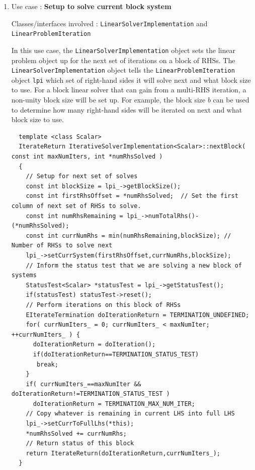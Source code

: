 \documentclass[pdf,ps2pdf,11pt]{SANDreport}
\begin{document}
\begin{enumerate}

{}\item Use case : \textbf{Setup to solve current block system}

{}\noindent{}Classes/interfaces involved :
{}\texttt{Linear\-Solver\-Implementation} and
{}\texttt{Linear\-Problem\-Iteration}

In this use case, the {}\texttt{Linear\-Solver\-Implementation} object
sets the linear problem object up for the next set of iterations on a
block of RHSs.  The {}\texttt{Linear\-Solver\-Implementation} object
tells the {}\texttt{Linear\-Problem\-Iteration} object {}\texttt{lpi}
which set of right-hand sides it will solve next and what block size
to use.  For a block linear solver that can gain from a multi-RHS
iteration, a non-unity block size will be set up.  For example, the
block size $b$ can be used to determine how many right-hand sides will
be iterated on next and what block size to use.

{\scriptsize\begin{verbatim}
  template <class Scalar>
  IterateReturn IterativeSolverImplementation<Scalar>::nextBlock( const int maxNumIters, int *numRhsSolved )
  {
    // Setup for next set of solves
    const int blockSize = lpi_->getBlockSize();
    const int firstRhsOffset = *numRhsSolved;  // Set the first column of next set of RHSs to solve.
    const int numRhsRemaining = lpi_->numTotalRhs()-(*numRhsSolved);
    const int currNumRhs = min(numRhsRemaining,blockSize); // Number of RHSs to solve next
    lpi_->setCurrSystem(firstRhsOffset,currNumRhs,blockSize);
    // Inform the status test that we are solving a new block of systems
    StatusTest<Scalar> *statusTest = lpi_->getStatusTest();
    if(statusTest) statusTest->reset();
    // Perform iterations on this block of RHSs
    EIterateTermination doIterationReturn = TERMINATION_UNDEFINED;
    for( currNumIters_ = 0; currNumIters_ < maxNumIter; ++currNumIters_ ) {
      doIterationReturn = doIteration();
      if(doIterationReturn==TERMINATION_STATUS_TEST)
       break;
    }
    if( currNumIters_==maxNumIter && doIterationReturn!=TERMINATION_STATUS_TEST )
      doIterationReturn = TERMINATION_MAX_NUM_ITER;
    // Copy whatever is remaining in current LHS into full LHS
    lpi_->setCurrToFullLhs(*this);
    *numRhsSolved += currNumRhs;
    // Return status of this block
    return IterateReturn(doIterationReturn,currNumIters_);
  }
\end{verbatim}}


\end{enumerate}
\end{document}
